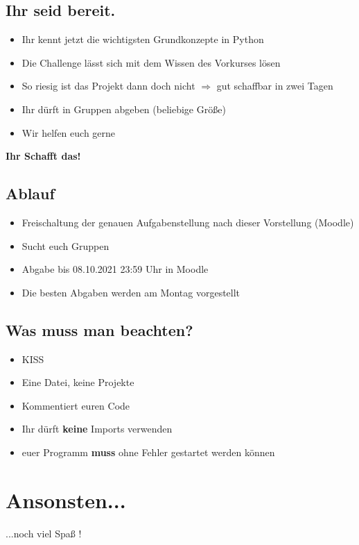 \subsection{Ihr seid bereit.}
\begin{frame}
    \slidehead
    \begin{itemize}
        \item Ihr kennt jetzt die wichtigsten Grundkonzepte in Python
        \item Die Challenge lässt sich mit dem Wissen des Vorkurses lösen
        \item So riesig ist das Projekt dann doch nicht $\Rightarrow$ gut schaffbar in zwei Tagen
        \item Ihr dürft in Gruppen abgeben (beliebige Größe)
        \item Wir helfen euch gerne
    \end{itemize}
    \pause
    \vspace{\fill}
    \begin{center}
        \textbf{\huge Ihr Schafft das!}
    \end{center}
    \vspace{\fill}
\end{frame}

\subsection{Ablauf}
\begin{frame}
    \slidehead
    \begin{itemize}
        \item Freischaltung der genauen Aufgabenstellung nach dieser Vorstellung (Moodle)
        \item Sucht euch Gruppen
        \item Abgabe bis 08.10.2021 23:59 Uhr in Moodle
        \item Die besten Abgaben werden am Montag vorgestellt
    \end{itemize}
\end{frame}

\subsection{Was muss man beachten?}
\begin{frame}
    \slidehead
    \begin{itemize}
        \item KISS
        \item Eine Datei, keine Projekte
        \item Kommentiert euren Code
        \item Ihr dürft \textbf{keine} Imports verwenden
        \item euer Programm \textbf{muss} ohne Fehler gestartet werden können
    \end{itemize}
\end{frame}

\section{Ansonsten...}
\begin{frame}
    \slidehead
    \vspace{\fill}
    \begin{center}
        \huge ...noch viel Spaß !
    \end{center}
    \vspace{\fill}
\end{frame}

